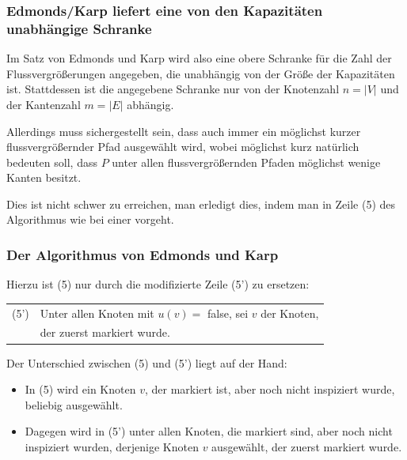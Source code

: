 \documentclass[smaller]{beamer}
\begin{document}
\begin{frame}
 \frametitle{Edmonds/Karp liefert eine von den Kapazitäten unabhängige Schranke}
 Im Satz von Edmonds und Karp wird also eine obere Schranke für die Zahl der Flussvergrößerungen angegeben, die \alert{unabhängig von der Größe der Kapazitäten} ist. Stattdessen ist die angegebene Schranke nur von der Knotenzahl $n=|V|$ und der Kantenzahl $m=|E|$ abhängig. \\ \vspace*{0.2cm}
 
 \alert{Allerdings muss sichergestellt sein, dass auch immer ein möglichst kurzer flussvergrößernder Pfad ausgewählt wird}, wobei {\glqq}möglichst kurz{\grqq} natürlich bedeuten soll, dass $P$ unter allen flussvergrößernden Pfaden möglichst wenige Kanten besitzt. \\ \vspace*{0.2cm}

\alert{Dies ist nicht schwer zu erreichen}, man erledigt dies, indem man in Zeile (5) des Algorithmus wie bei einer  vorgeht.
\end{frame}

\begin{frame}
 \frametitle{Der Algorithmus von Edmonds und Karp}
 Hierzu ist (5) nur durch die modifizierte Zeile (5') zu ersetzen: \\ \vspace*{0.2cm}

\begin{tabular}{rl}
(5')& Unter allen Knoten mit $u(v) =$ false, sei $v$ der Knoten,  \\
    & der zuerst markiert wurde.
\end{tabular}
\label{page:9:6}
\vspace*{0.2cm}

Der Unterschied zwischen (5) und (5') liegt auf der Hand:
\begin{itemize}
\item In (5) wird ein Knoten $v$, der markiert ist, aber noch nicht inspiziert wurde, \alert{beliebig} ausgewählt.
\item Dagegen wird in (5') unter allen Knoten, die markiert sind, aber noch nicht inspiziert wurden, derjenige Knoten $v$ ausgewählt, \alert{der zuerst markiert wurde}.
\end{itemize}
\end{frame}
\end{document}

